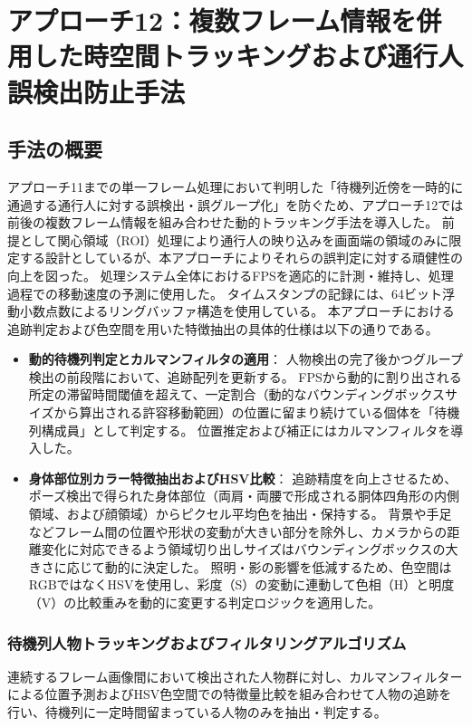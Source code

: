 \section{アプローチ12：複数フレーム情報を併用した時空間トラッキングおよび通行人誤検出防止手法}

\subsection{手法の概要}
アプローチ11までの単一フレーム処理において判明した「待機列近傍を一時的に通過する通行人に対する誤検出・誤グループ化」を防ぐため、アプローチ12では前後の複数フレーム情報を組み合わせた動的トラッキング手法を導入した。
前提として関心領域（ROI）処理により通行人の映り込みを画面端の領域のみに限定する設計としているが、本アプローチによりそれらの誤判定に対する頑健性の向上を図った。
処理システム全体におけるFPSを適応的に計測・維持し、処理過程での移動速度の予測に使用した。
タイムスタンプの記録には、64ビット浮動小数点数によるリングバッファ構造を使用している。
本アプローチにおける追跡判定および色空間を用いた特徴抽出の具体的仕様は以下の通りである。

\begin{itemize}
    \item \textbf{動的待機列判定とカルマンフィルタの適用}：
    人物検出の完了後かつグループ検出の前段階において、追跡配列を更新する。
    FPSから動的に割り出される所定の滞留時間閾値を超えて、一定割合（動的なバウンディングボックスサイズから算出される許容移動範囲）の位置に留まり続けている個体を「待機列構成員」として判定する。
    位置推定および補正にはカルマンフィルタを導入した。
    
    \item \textbf{身体部位別カラー特徴抽出およびHSV比較}：
    追跡精度を向上させるため、ポーズ検出で得られた身体部位（両肩・両腰で形成される胴体四角形の内側領域、および顔領域）からピクセル平均色を抽出・保持する。
    背景や手足などフレーム間の位置や形状の変動が大きい部分を除外し、カメラからの距離変化に対応できるよう領域切り出しサイズはバウンディングボックスの大きさに応じて動的に決定した。
    照明・影の影響を低減するため、色空間はRGBではなくHSVを使用し、彩度（S）の変動に連動して色相（H）と明度（V）の比較重みを動的に変更する判定ロジックを適用した。
\end{itemize}

\subsubsection{待機列人物トラッキングおよびフィルタリングアルゴリズム}
連続するフレーム画像間において検出された人物群に対し、カルマンフィルターによる位置予測およびHSV色空間での特徴量比較を組み合わせて人物の追跡を行い、待機列に一定時間留まっている人物のみを抽出・判定する。

